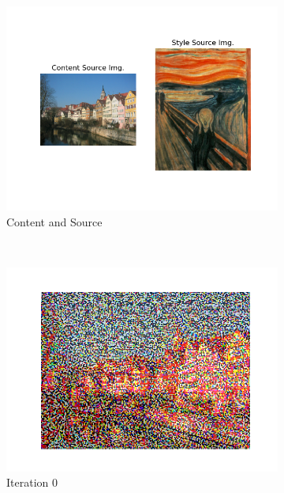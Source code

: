 \documentclass[12pt]{article}
\begin{document}
\begin{figure}[htbp]
    \centering
    \begin{subfigure}[t]{0.48\textwidth}
        \centering
        \includegraphics[trim={3in 1in 3in 1in},scale=0.8]{./Homework2/output/hw2p2_fig05.png}
        \caption{Content and Source}
    \label{hw2p2f}
    \end{subfigure}\\
    \begin{subfigure}[t]{0.48\textwidth}
        \centering
        \includegraphics[trim={3in 0in 3in 0in},scale=0.5]{./Homework2/output/hw2p2_fig06.png}
        \caption{Iteration 0}
    \label{hw2p2g}
    \end{subfigure}
    \begin{subfigure}[t]{0.48\textwidth}

\end{subfigure}
\end{figure}
\end{document}
